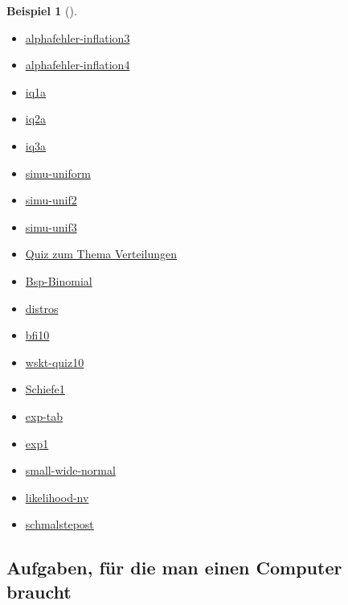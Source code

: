 \documentclass[
  ngerman,
  letterpaper,
  twoside,
  open=any]{scrbook}
\providecommand{\tightlist}{%
  \setlength{\itemsep}{0pt}\setlength{\parskip}{0pt}}\usepackage{longtable,booktabs,array}
\theoremstyle{definition}
\newtheorem{example}{Beispiel}[chapter]
\theoremstyle{plain}
\theoremstyle{definition}
\theoremstyle{definition}
\theoremstyle{remark}
\begin{document}
\begin{example}[]
\begin{itemize}
\tightlist
\item
  \href{https://datenwerk.netlify.app/posts/alphafehler-inflation3/alphafehler-inflation3.html}{alphafehler-inflation3}
\item
  \href{https://datenwerk.netlify.app/posts/alphafehler-inflation4/alphafehler-inflation4.html}{alphafehler-inflation4}
\item
  \href{https://datenwerk.netlify.app/posts/iq01a/}{iq1a}
\item
  \href{https://datenwerk.netlify.app/posts/iq02a/}{iq2a}
\item
  \href{https://datenwerk.netlify.app/posts/iq03a/}{iq3a}
\item
  \href{https://datenwerk.netlify.app/posts/simu-uniform/}{simu-uniform}
\item
  \href{https://datenwerk.netlify.app/posts/simu-unif2/}{simu-unif2}
\item
  \href{https://datenwerk.netlify.app/posts/simu-unif3/}{simu-unif3}
\item
  \href{https://datenwerk.netlify.app/\#category=Verteilungen-Quiz24}{Quiz
  zum Thema Verteilungen}
\item
  \href{https://datenwerk.netlify.app/posts/bsp-binomial/bsp-binomial}{Bsp-Binomial}
\item
  \href{https://sebastiansauer.github.io/datenwerk/posts/distros/}{distros}
\item
  \href{https://sebastiansauer.github.io/datenwerk/posts/bfi10/}{bfi10}
\item
  \href{https://sebastiansauer.github.io/datenwerk/posts/wskt-quiz10/wskt-quiz10.html}{wskt-quiz10}
\item
  \href{https://datenwerk.netlify.app/posts/schiefe1/schiefe1.html}{Schiefe1}
\item
  \href{https://sebastiansauer.github.io/datenwerk/posts/exp-tab/}{exp-tab}
\item
  \href{https://sebastiansauer.github.io/datenwerk/posts/exp1/}{exp1}
\item
  \href{https://sebastiansauer.github.io/datenwerk/posts/small-wide-normal/}{small-wide-normal}
\item
  \href{https://datenwerk.netlify.app/posts/likelihood-nv/likelihood-nv.html}{likelihood-nv}
\item
  \href{https://datenwerk.netlify.app/posts/schmalste-post/}{schmalstepost}
\end{itemize}

\subsection{Aufgaben, für die man einen Computer
braucht}\label{aufgaben-fuxfcr-die-man-einen-computer-braucht-3}


\end{example}
\end{document}
